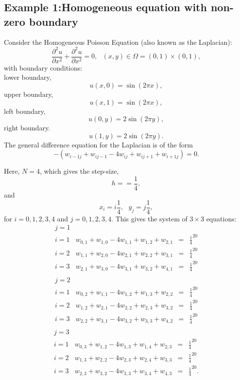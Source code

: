 \subsection{Example 1:Homogeneous equation with non-zero boundary}
Consider the Homogeneous Poisson Equation (also known as the Laplacian):\[ \frac{\partial^2 u}{\partial x^2}+\frac{\partial^2 u}{\partial x^2}=0, \ \ \ (x,y) \in \Omega=(0,1)\times (0,1), \]
with boundary conditions:\\
lower boundary,
\[u(x,0) = \sin(2\pi x), \]
upper boundary,
\[u(x,1) = \sin(2\pi x),  \]
left boundary,
\[u(0,y) = 2\sin(2\pi y), \]
right boundary.
\[u(1,y) =  2\sin(2\pi y). \]
The general difference equation for the Laplacian is of the form
\[-(w_{i-1j}+w_{ij-1}-4w_{ij}+w_{ij+1}+w_{i+1j})=0. \]

Here, $N=4$, which gives the step-size,
\[h==\frac{1}{4},\]
and
\[x_i=i\frac{1}{4}, \ \ \ y_j=j\frac{1}{4},\]
for $i=0,1,2,3,4$ and $j=0,1,2,3,4$.
This gives the system of $3\times 3$ equations:
\[\begin{array}{l|rcl}
j=1\\
i=1&w_{0,1}+w_{1,0}-4w_{1,1}+w_{1,2}+w_{2,1}&=&\frac{1}{4}^20\\
i=2&w_{1,1}+w_{2,0}-4w_{2,1}+w_{2,2}+w_{3,1}&=&\frac{1}{4}^20\\
i=3&w_{2,1}+w_{3,0}-4w_{3,1}+w_{3,2}+w_{4,1}&=&\frac{1}{4}^20\\
\end{array}
\]	
\[\begin{array}{l|rcl}
j=2\\
i=1&w_{0,2}+w_{1,1}-4w_{1,2}+w_{1,3}+w_{2,2}&=&\frac{1}{4}^20\\
i=2&w_{1,2}+w_{2,1}-4w_{2,2}+w_{2,3}+w_{3,2}&=&\frac{1}{4}^20\\
i=3&w_{2,2}+w_{3,1}-4w_{3,2}+w_{3,3}+w_{4,2}&=&\frac{1}{4}^20\\
\end{array}
\]	
\[\begin{array}{l|rcl}
j=3\\
i=1&w_{0,3}+w_{1,2}-4w_{1,3}+w_{1,4}+w_{2,3}&=&\frac{1}{4}^20\\
i=2&w_{1,3}+w_{2,2}-4w_{2,3}+w_{2,4}+w_{3,3}&=&\frac{1}{4}^20\\
i=3&w_{2,3}+w_{3,2}-4w_{3,3}+w_{3,4}+w_{4,3}&=&\frac{1}{4}^20.
\end{array}
\]	

